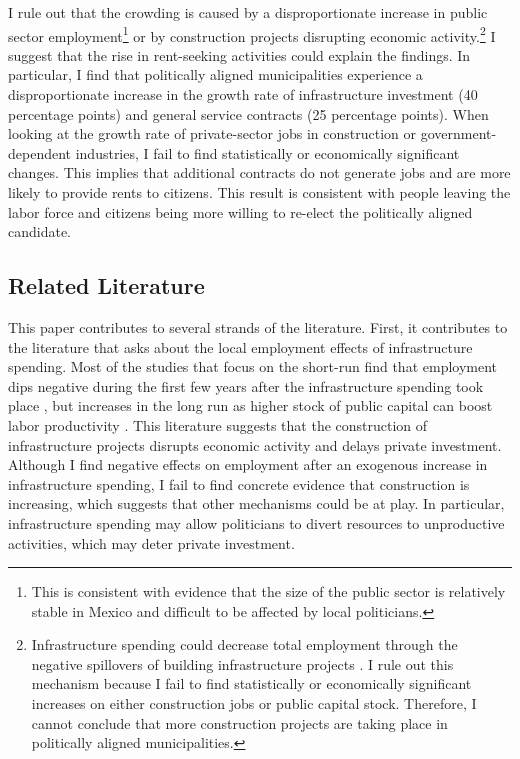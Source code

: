 \documentclass[dv_diss_main.tex]{subfiles}
\begin{document}
I rule out that the crowding is caused by a disproportionate increase in public sector employment\footnote{ This is consistent with evidence that the size of the public sector is relatively stable in Mexico and difficult to be affected by local politicians.} or by construction projects disrupting economic activity.\footnote{ 
Infrastructure spending could decrease total employment through the negative spillovers of building infrastructure projects \cite{ramey2020macroeconomic}. I rule out this mechanism because I fail to find statistically or economically significant increases on either construction jobs or public capital stock. Therefore, I cannot conclude that more construction projects are taking place in politically aligned municipalities.
} 
I suggest that the rise in rent-seeking activities could explain the findings. In particular, I find that politically aligned municipalities experience a disproportionate increase in the growth rate of infrastructure investment (40 percentage points) and general service contracts (25 percentage points). When looking at the growth rate of private-sector jobs in construction or government-dependent industries, I fail to find statistically or economically significant changes. This implies that additional contracts do not generate jobs and are more likely to provide rents to citizens. This result is consistent with people leaving the labor force and citizens being more willing to re-elect the politically aligned candidate. 

\vspace{2mm}
\subsection{Related Literature} This paper contributes to several strands of the literature. 
First, it contributes to the literature that asks about the local employment effects of infrastructure spending. 
Most of the studies that focus on the short-run find that employment dips negative during the first few years after the infrastructure spending took place \citep{garin2019putting,leduc2013roads,dupor2017so,buchheim2017employment}, but increases in the long run as higher stock of public capital can boost labor productivity
\citep{kline2014local, yaffe2020essays,leduc2013roads,allen2019welfare}.
This literature suggests that the construction of infrastructure projects disrupts economic activity and delays private investment. Although I find negative effects on employment after an exogenous increase in infrastructure spending, I fail to find concrete evidence that construction is increasing, which suggests that other mechanisms could be at play. In particular, infrastructure spending may allow politicians to divert resources to unproductive activities, which may deter private investment. 
\end{document}
